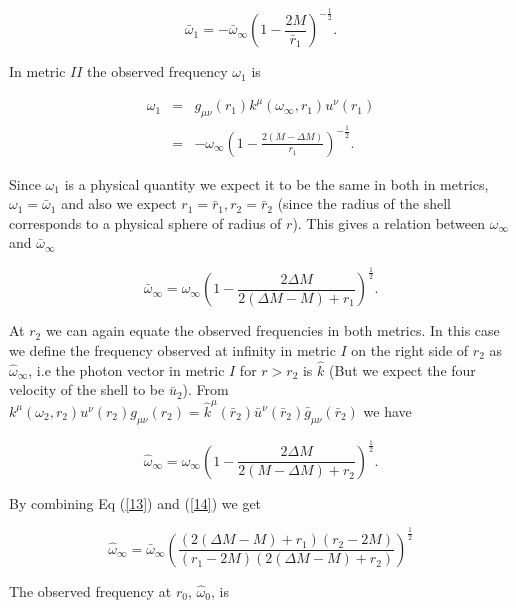 \documentclass[aps,showpacs,twocolumn,floats,prd,superscriptaddress,nofootinbib]{revtex4-1}
\begin{document}
\begin{equation}
	\bar{\omega}_1 = - \bar{\omega}_\infty \left (1 - \frac{2M}{\bar{r}_1} \right)^{-\frac{1}{2}}.
\end{equation}

In metric $II$ the observed frequency $\omega_1$ is 

\begin{eqnarray}
	\omega_1 & = & g_{\mu \nu}(r_1) k^\mu(\omega_\infty, r_1) u^\nu(r_1)	\nonumber	\\
	& = & - \omega_\infty \left( 1 - \frac{2(M- \Delta M)}{r_1} \right)^{-\frac{1}{2}}.
\end{eqnarray}

Since $\omega_1$ is a physical quantity we expect it to be the same in both in metrics, $\omega_1 = \bar{\omega}_1$ and also we expect $r_1 = \bar{r}_1, r_2 = \bar{r}_2$ (since the radius of the shell corresponds to a physical sphere of radius of $r$). This gives a relation between $\omega_\infty$ and $\bar{\omega}_\infty$

\begin{equation}
	\bar{\omega}_\infty = \omega_\infty \left( 1 - \frac{2 \Delta M}{2(\Delta M  - M)+ r_1} \right)^\frac{1}{2}.	\label{13}
\end{equation}

At $r_2$ we can again equate the observed frequencies in both metrics. In this case we define the frequency observed at infinity in metric $I$ on the right side of $r_2$ as $\hat{\omega}_\infty$, i.e the photon vector in metric $I$ for $r > r_2$ is $\hat{k}$ (But we expect the four velocity of the shell to be $\bar{u}_2$). From $k^\mu(\omega_2, r_2) u^\nu(r_2) g_{\mu \nu}(r_2) = \hat{k}^\mu(\bar{r}_2) \bar{u}^\nu(\bar{r}_2) \bar{g}_{\mu \nu} (\bar{r}_2)$ we have

\begin{equation}
	\hat{\omega}_\infty = \omega_\infty \left( 1 - \frac{2 \Delta M}{2(M-\Delta M) + r_2} \right)^\frac{1}{2}.	\label{14}
\end{equation}

By combining Eq (\ref{13}) and (\ref{14}) we get 

\begin{equation}
	\hat{\omega}_\infty = \bar{\omega}_\infty \left( \frac{(2 (\Delta M - M) + r_1)(r_2 - 2M)}{(r_1 - 2M)(2(\Delta M - M) + r_2)} \right)^\frac{1}{2}
\end{equation}

The observed frequency at $r_0$, $\hat{\omega}_0$, is
\end{document}
